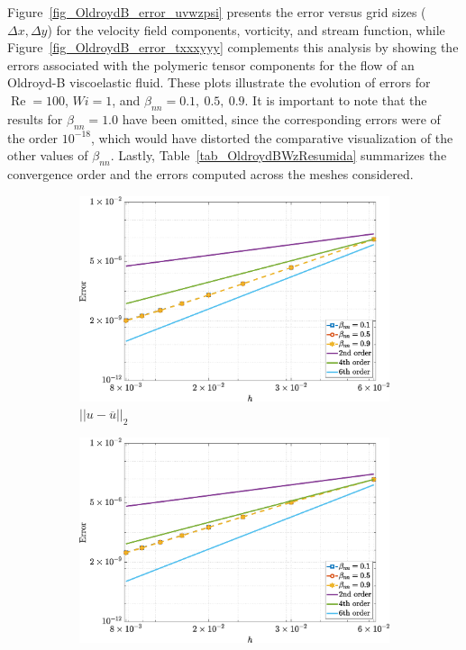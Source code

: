\documentclass[preprint, 12pt]{elsarticle}
\begin{document}
Figure~\ref{fig_OldroydB_error_uvwzpsi} presents the error versus grid sizes ($\Delta x, \Delta y$) for the velocity field components, vorticity, and stream function, while Figure~\ref{fig_OldroydB_error_txxxyyy} complements this analysis by showing the errors associated with the polymeric tensor components for the flow of an Oldroyd-B viscoelastic fluid. These plots illustrate the evolution of errors for $\operatorname{Re}=100$, $Wi=1$, and $\beta_{nn}=0.1,\ 0.5,\ 0.9$. It is important to note that the results for $\beta_{nn}=1.0$ have been omitted, since the corresponding errors were of the order $10^{-18}$, which would have distorted the comparative visualization of the other values of $\beta_{nn}$. Lastly, Table~\ref{tab_OldroydBWzResumida} summarizes the convergence order and the errors computed across the meshes considered.
\begin{figure}[H]
    \centering  
    \begin{subfigure}[b]{.46\textwidth}
        \includegraphics[width=\textwidth]{NormErr_2nd_Re_100_Wi_1_epsilon_0_xi_0_alphaG_0_Dt_1e-06_at_0.05_tipsim_1_MMS_12_U.eps}
        \caption{$||u - \overline{u}||_{2}$}
        \label{error_u_2nd_Case1_oldorydb}
    \end{subfigure}
    \vspace{0.2cm}
    \qquad
    \begin{subfigure}[b]{.46\textwidth}
        \includegraphics[width=\textwidth]{NormErr_2nd_Re_100_Wi_1_epsilon_0_xi_0_alphaG_0_Dt_1e-06_at_0.05_tipsim_1_MMS_12_V.eps}

\end{subfigure}
\end{figure}
\end{document}

